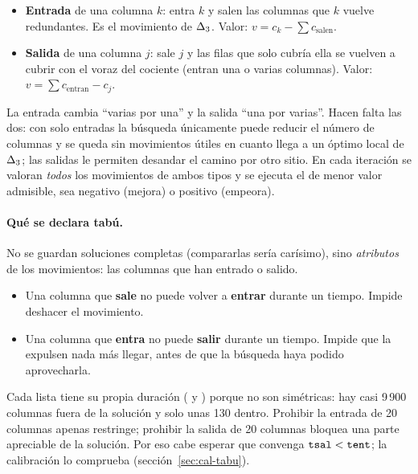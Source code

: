 \begin{decision}
\begin{itemize}[itemsep=1pt]
  \item \textbf{Entrada} de una columna $k$: entra $k$ y salen las columnas que $k$ vuelve
        redundantes. Es el movimiento de $\Delta_{3}$. Valor: $v=c_k-\sum c_{\text{salen}}$.
  \item \textbf{Salida} de una columna $j$: sale $j$ y las filas que solo cubría ella se
        vuelven a cubrir con el voraz del cociente (entran una o varias columnas). Valor:
        $v=\sum c_{\text{entran}}-c_j$.
\end{itemize}
La entrada cambia ``varias por una'' y la salida ``una por varias''. Hacen falta las dos: con
solo entradas la búsqueda únicamente puede reducir el número de columnas y se queda sin
movimientos útiles en cuanto llega a un óptimo local de $\Delta_{3}$; las salidas le permiten
desandar el camino por otro sitio. En cada iteración se valoran \emph{todos} los movimientos
de ambos tipos y se ejecuta el de menor valor admisible, sea negativo (mejora) o positivo
(empeora).
\end{decision}

\paragraph{Qué se declara tabú.} No se guardan soluciones completas (compararlas sería
carísimo), sino \emph{atributos} de los movimientos: las columnas que han entrado o salido.

\begin{decision}
\begin{itemize}[itemsep=1pt]
  \item Una columna que \textbf{sale} no puede volver a \textbf{entrar} durante un tiempo.
        Impide deshacer el movimiento.
  \item Una columna que \textbf{entra} no puede \textbf{salir} durante un tiempo. Impide que
        la expulsen nada más llegar, antes de que la búsqueda haya podido aprovecharla.
\end{itemize}
Cada lista tiene su propia duración ( y ) porque no son simétricas: hay
casi 9\,900 columnas fuera de la solución y solo unas 130 dentro. Prohibir la entrada de 20
columnas apenas restringe; prohibir la salida de 20 columnas bloquea una parte apreciable de
la solución. Por eso cabe esperar que convenga $\texttt{tsal}<\texttt{tent}$; la calibración lo
comprueba (sección~\ref{sec:cal-tabu}).
\end{decision}


